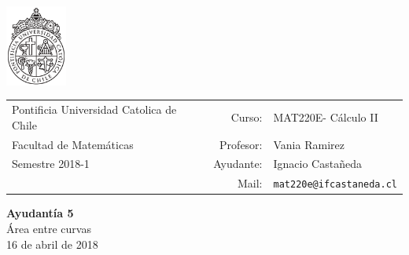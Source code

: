 \documentclass[12pt]{article}
\makeatletter
\newcommand{\ayudantia}{{\sc Ayudantía 5}}
\newcommand{\tituloayu}{Área entre curvas}
\newcommand{\fecha}{16 de abril de 2018}
\newcommand{\sigla}{MAT220E}
\newcommand{\nombre}{Cálculo II}
\newcommand{\profesor}{Vania Ramirez}
\newcommand{\ano}{2018}
\newcommand{\semestre}{1}
\newcommand{\mail}{mat220e@ifcastaneda.cl}
\makeatother
\begin{document}
\thispagestyle{empty}

\begin{minipage}{2cm}
	\includegraphics[width=2cm]{../../../../img/logo.pdf}
	\vspace{0.5cm}
\end{minipage}
\begin{minipage}{\linewidth}
	\begin{tabular}{lrl}
		{\scriptsize\sc Pontificia Universidad Catolica de Chile} & \hspace*{0.7in}Curso: &
		\sigla  - \nombre\\
		{\sc Facultad de Matemáticas}&
		Profesor: & \profesor \\
		{\sc Semestre \ano-\semestre} & Ayudante: & {Ignacio Castañeda}\\
		& {Mail:} & \texttt{\mail}
	\end{tabular}
\end{minipage}

\vspace{-10mm}
\begin{center}
	{\LARGE\bf \ayudantia}\\
	\vspace{0.1cm}
	{\tituloayu}\\
	\vspace{0.1cm}
	\fecha\\
	\vspace{0.4cm}
\end{center}
\end{document}
